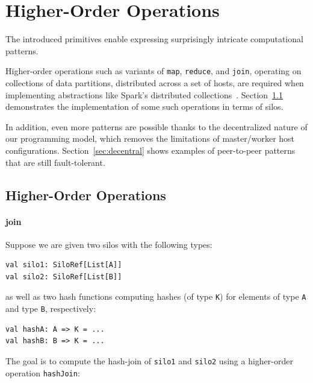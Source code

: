 \documentclass[10pt]{sigplanconf}
\theoremstyle{definition}
\theoremstyle{definition}
\begin{document}
\section{Higher-Order Operations}
\label{sec:higher-order-operations}

The introduced primitives enable expressing surprisingly intricate
computational patterns.

Higher-order operations such as variants of \verb|map|, \verb|reduce|, and
\verb|join|, operating on collections of data partitions, distributed across a
set of hosts, are required when implementing abstractions like Spark's
distributed collections~\cite{Spark}. Section~\ref{sec:dist-coll} demonstrates
the implementation of some such operations in terms of silos.

In addition, even more patterns are possible thanks to the decentralized nature
of our programming model, which removes the limitations of master/worker host
configurations. Section~\ref{sec:decentral} shows examples of peer-to-peer
patterns that are still fault-tolerant.


\subsection{Higher-Order Operations}
\label{sec:dist-coll}

%

\paragraph{join}

Suppose we are given two silos with the following types:

\begin{lstlisting}
val silo1: SiloRef[List[A]]
val silo2: SiloRef[List[B]]
\end{lstlisting}
\noindent
as well as two hash functions computing hashes (of type \verb|K|) for elements
of type \verb|A| and type \verb|B|, respectively:

\begin{lstlisting}
val hashA: A => K = ...
val hashB: B => K = ...
\end{lstlisting}
\noindent
The goal is to compute the hash-join of \verb|silo1| and \verb|silo2| using a
higher-order operation \verb|hashJoin|:
\end{document}

